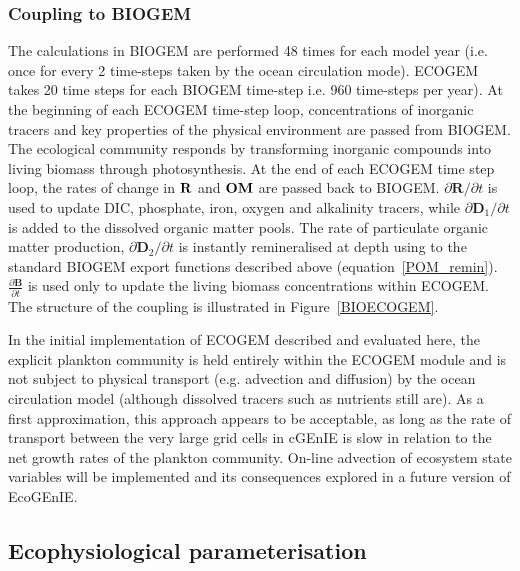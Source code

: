 \documentclass[gmd, manuscript]{copernicus}
\begin{document}
{\subsubsection{Coupling to BIOGEM}

The calculations in BIOGEM are performed 48 times for each model year (i.e. once for every 2 time-steps taken by the ocean circulation mode). ECOGEM takes 20 time steps for each BIOGEM time-step i.e. 960 time-steps per year). At the beginning of each ECOGEM time-step loop, concentrations of inorganic tracers and key properties of the physical environment are passed from BIOGEM. The ecological community responds by transforming inorganic compounds into living biomass through photosynthesis. At the end of each ECOGEM time step loop, the rates of change in $\bf{R}$ and $\bf{OM}$ are passed back to BIOGEM. ${\partial {\mathbf R}}/{\partial t}$ is used to update DIC, phosphate, iron, oxygen and alkalinity tracers, while ${\partial {\mathbf D}_1}/{\partial t}$ is added to the dissolved organic matter pools. The rate of particulate organic matter production, ${\partial {\mathbf D}_2}/{\partial t}$ is instantly remineralised at depth using to the standard BIOGEM export functions described above (equation~\ref{POM_remin}). $\frac{\partial {\mathbf B}}{\partial t}$ is used only to update the living biomass concentrations within ECOGEM. The structure of the coupling is illustrated in Figure~\ref{BIOECOGEM}.





In the initial implementation of ECOGEM described and evaluated here, the explicit plankton community is held entirely within the ECOGEM module and is not subject to physical transport (e.g. advection and diffusion) by the ocean circulation model (although dissolved tracers such as nutrients still are). As a first approximation, this approach appears to be acceptable, as long as the rate of transport between the very large grid cells in cGEnIE is slow in relation to the net growth rates of the plankton community. On-line advection of ecosystem state variables will be implemented and its consequences explored in a future version of EcoGEnIE. 

\subsection{Ecophysiological parameterisation}\label{Parameters}

}
\end{document}

